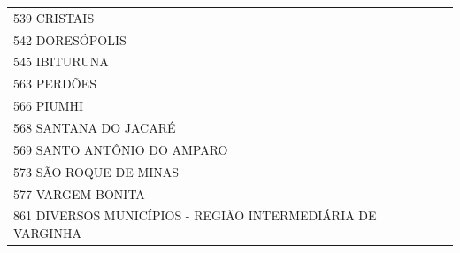 \documentclass{article}
\begin{document}
\begin{longtable}[c]{m{18cm}}
\multicolumn{1}{l}{ \hspace{2em} 539 CRISTAIS } \\
\multicolumn{1}{l}{ \hspace{2em} 542 DORESÓPOLIS } \\
\multicolumn{1}{l}{ \hspace{2em} 545 IBITURUNA } \\
\multicolumn{1}{l}{ \hspace{2em} 563 PERDÕES } \\
\multicolumn{1}{l}{ \hspace{2em} 566 PIUMHI } \\
\multicolumn{1}{l}{ \hspace{2em} 568 SANTANA DO JACARÉ } \\
\multicolumn{1}{l}{ \hspace{2em} 569 SANTO ANTÔNIO DO AMPARO } \\
\multicolumn{1}{l}{ \hspace{2em} 573 SÃO ROQUE DE MINAS } \\
\multicolumn{1}{l}{ \hspace{2em} 577 VARGEM BONITA } \\
\multicolumn{1}{l}{ \hspace{2em} 861 DIVERSOS MUNICÍPIOS - REGIÃO INTERMEDIÁRIA DE VARGINHA } \\
\end{longtable}
\newpage
\end{document}
